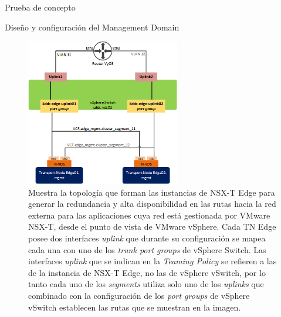 \begin{section}{Prueba de concepto}
\begin{subsection}{Diseño y configuración del Management Domain}
\begin{figure}[h]
      \includegraphics[width=0.6\textwidth]{imaxes/pruebaconcepto/UplinkDesign.png}
      \caption{Muestra la topología que forman las instancias de NSX-T Edge para generar la redundancia y alta disponibilidad en las rutas hacia la red externa para las aplicaciones cuya red está gestionada por VMware NSX-T, desde el punto de vista de VMware vSphere. Cada TN Edge posee dos interfaces \textit{uplink} que durante su configuración se mapea cada una con uno de los \textit{trunk port groups} de vSphere Switch. Las interfaces \textit{uplink} que se indican en la \textit{Teaming Policy} se refieren a las de la instancia de NSX-T Edge, no las de vSphere vSwitch, por lo tanto cada uno de los \textit{segments} utiliza solo uno de los \textit{uplinks} que combinado con la configuración de los \textit{port groups} de vSphere vSwitch establecen las rutas que se muestran en la imagen.}
      \label{fig:Uplink-Design-Edge-NSXT} 
    \end{figure}
    \FloatBarrier
          

\end{subsection}
\end{section}
